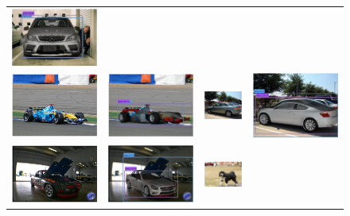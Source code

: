 \documentclass[10pt,twocolumn,letterpaper]{article}
\begin{document}
\begin{figure}[h]
\begin{tabular}{|cc|cc|}
  \includegraphics[width=0.24\linewidth]{supp/pas_car16b.png}  \\
  \includegraphics[width=0.24\linewidth]{supp/pas_car17a.png} &
  \includegraphics[width=0.24\linewidth]{supp/pas_car17b.png} & 
  \includegraphics[width=0.24\linewidth]{supp/pas_car19a.png} &
  \includegraphics[width=0.24\linewidth]{supp/pas_car19b.png} \\
  \includegraphics[width=0.24\linewidth]{supp/pas_car21a.png} &
  \includegraphics[width=0.24\linewidth]{supp/pas_car21b.png} & 
  \includegraphics[width=0.24\linewidth]{supp/pas_car22a.png} &

\end{tabular}
\end{figure}
\end{document}
